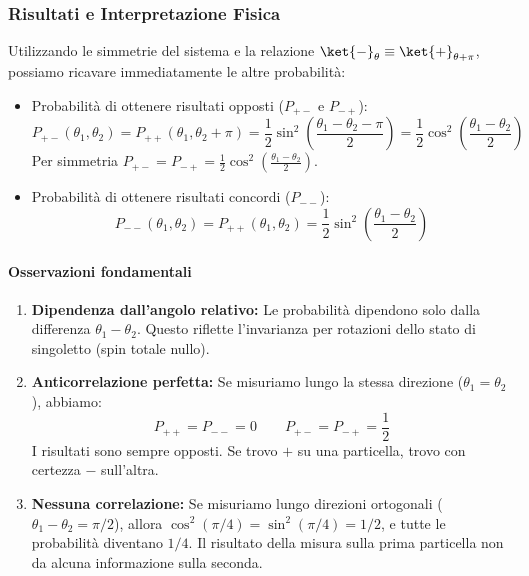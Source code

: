 \subsubsection{Risultati e Interpretazione Fisica}

Utilizzando le simmetrie del sistema e la relazione \(\ket{-}_{\theta} \equiv \ket{+}_{\theta+\pi}\), possiamo ricavare immediatamente le altre probabilità:
\begin{itemize}
    \item Probabilità di ottenere risultati opposti (\(P_{+-}\) e \(P_{-+}\)):
    \[
        P_{+-}(\theta_1, \theta_2) = P_{++}(\theta_1, \theta_2+\pi) = \frac{1}{2} \sin^2\left( \frac{\theta_1 - \theta_2 - \pi}{2} \right) = \frac{1}{2} \cos^2\left( \frac{\theta_1 - \theta_2}{2} \right)
    \]
    Per simmetria \(P_{+-} = P_{-+} = \frac{1}{2} \cos^2\left( \frac{\theta_1 - \theta_2}{2} \right)\).
    \item Probabilità di ottenere risultati concordi (\(P_{--}\)):
    \[
        P_{--}(\theta_1, \theta_2) = P_{++}(\theta_1, \theta_2) = \frac{1}{2} \sin^2\left( \frac{\theta_1 - \theta_2}{2} \right)
    \]
\end{itemize}

\paragraph{Osservazioni fondamentali}
\begin{enumerate}
    \item \textbf{Dipendenza dall'angolo relativo:} Le probabilità dipendono solo dalla differenza \(\theta_1 - \theta_2\). Questo riflette l'invarianza per rotazioni dello stato di singoletto (spin totale nullo).
    \item \textbf{Anticorrelazione perfetta:} Se misuriamo lungo la stessa direzione (\(\theta_1 = \theta_2\)), abbiamo:
    \[
        P_{++} = P_{--} = 0 \qquad P_{+-} = P_{-+} = \frac{1}{2}
    \]
    I risultati sono sempre opposti. Se trovo \(+\) su una particella, trovo con certezza \(-\) sull'altra.
    \item \textbf{Nessuna correlazione:} Se misuriamo lungo direzioni ortogonali (\(\theta_1 - \theta_2 = \pi/2\)), allora \(\cos^2(\pi/4) = \sin^2(\pi/4) = 1/2\), e tutte le probabilità diventano \(1/4\). Il risultato della misura sulla prima particella non da alcuna informazione sulla seconda.
\end{enumerate}




